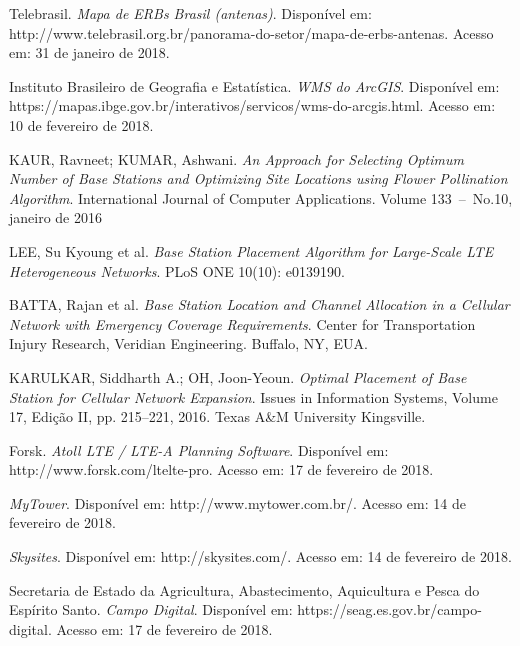\documentclass[12pt,a4paper]{article}
\begin{document}
\begin{thebibliography}{9}

Telebrasil.
\textit{Mapa de ERBs Brasil (antenas)}.
Disponível em: http://www.telebrasil.org.br/panorama-do-setor/mapa-de-erbs-antenas.
Acesso em: 31 de janeiro de 2018.

Instituto Brasileiro de Geografia e Estatística.
\textit{WMS do ArcGIS}.
Disponível em: https://mapas.ibge.gov.br/interativos/servicos/wms-do-arcgis.html.
Acesso em: 10 de fevereiro de 2018.

KAUR, Ravneet; KUMAR, Ashwani.
\textit{An Approach for Selecting Optimum Number of Base Stations and Optimizing Site Locations using Flower Pollination Algorithm}.
International Journal of Computer Applications.
Volume 133~--~No.10, janeiro de 2016

LEE, Su Kyoung et al.
\textit{Base Station Placement Algorithm for Large-Scale LTE Heterogeneous Networks}.
PLoS ONE 10(10): e0139190.

BATTA, Rajan et al.
\textit{Base Station Location and Channel Allocation in a Cellular Network with Emergency Coverage Requirements}.
Center for Transportation Injury Research, Veridian Engineering.
Buffalo, NY, EUA.

KARULKAR, Siddharth A.; OH, Joon-Yeoun.
\textit{Optimal Placement of Base Station for Cellular Network Expansion}.
Issues in Information Systems, Volume 17, Edição II, pp. 215--221, 2016.
Texas A\&M University Kingsville.

Forsk.
\textit{Atoll LTE / LTE-A Planning Software}.
Disponível em: http://www.forsk.com/ltelte-pro.
Acesso em: 17 de fevereiro de 2018.

\textit{MyTower}.
Disponível em: http://www.mytower.com.br/.
Acesso em: 14 de fevereiro de 2018.

\textit{Skysites}.
Disponível em: http://skysites.com/.
Acesso em: 14 de fevereiro de 2018.

Secretaria de Estado da Agricultura, Abastecimento, Aquicultura e Pesca do Espírito Santo.
\textit{Campo Digital}.
Disponível em: https://seag.es.gov.br/campo-digital.
Acesso em: 17 de fevereiro de 2018.

\end{thebibliography}
\end{document}
